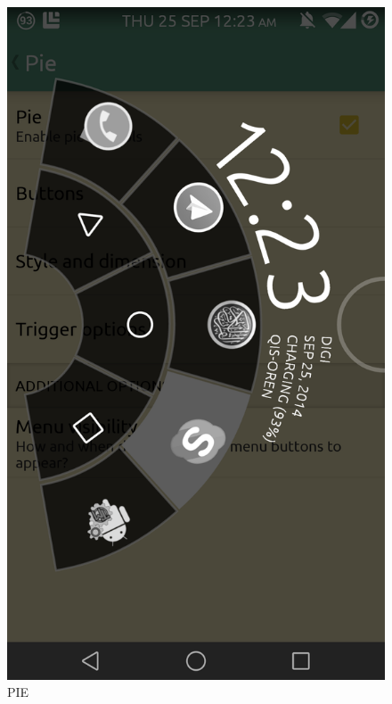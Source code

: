\documentclass{beamer}
\begin{document}
   {
\begin{frame}
\begin{columns}[t]
 
 \begin{column}{5cm}
  
 \begin{figure}
 \includegraphics[scale=0.1]{pie}
   \caption{\tiny{PIE}}
 \end{figure}

 
\end{column}


\end{columns}
\end{frame}}
\end{document}
